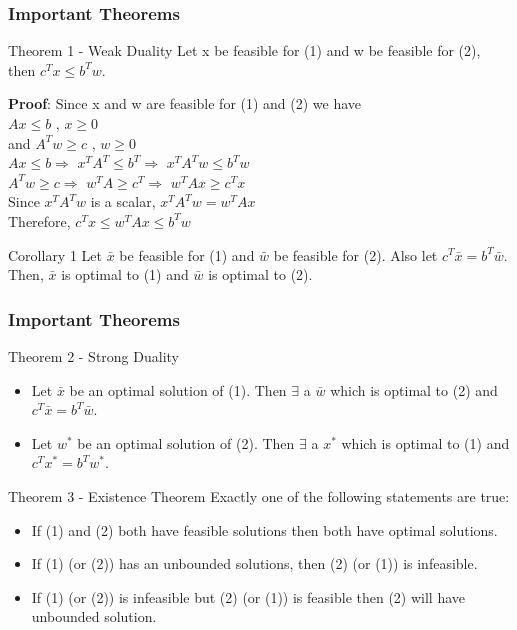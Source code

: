 \documentclass[9pt]{beamer}
\begin{document}
\begin{frame}
\frametitle{Important Theorems}
\begin{block}{Theorem 1 - Weak Duality}
Let x be feasible for (1) and w be feasible for (2), then $ c^T x \leq b^T w $.
\end{block}

\textbf{Proof}: Since x and w are feasible for (1) and (2) we have \\
$ A x \leq b $ , $ x \geq 0 $ \\
and $ A^T w \geq c $ , $ w \geq 0$ \\

$ A x \leq b \Rightarrow $ $ x^T A^T \leq b^T \Rightarrow$ $ x^T A^T w \leq b^T w$\\

$ A^T w \geq c \Rightarrow $ $ w^T A \geq c^T \Rightarrow$ $ w^T A x \geq c^T x$\\

Since $ x^T A^T w $ is a scalar, $ x^T A^T w = w^T A x $\\

Therefore, $ c^T x \leq w^T A x \leq b^T w $

\begin{block}{Corollary 1}
Let $ \bar{x} $ be feasible for (1) and $ \bar{w} $ be feasible for (2). Also let $ c^T \bar{x} = b^T \bar{w} $.\\
Then, $ \bar{x} $ is optimal to (1) and $ \bar{w} $ is optimal to (2). 
\end{block}
\end{frame}

\begin{frame}
\frametitle{Important Theorems}
\begin{block}{Theorem 2 - Strong Duality}
\begin{itemize}
    \item Let $ \bar{x} $ be an optimal solution of (1). Then $ \exists $ a $ \bar{w} $ which is optimal to (2) and $ c^T \bar{x} = b^T \bar{w} $. 
    \item Let $ w^* $ be an optimal solution of (2). Then $ \exists $ a $ x^* $ which is optimal to (1) and $ c^T x^* = b^T w^* $. 
\end{itemize}
\end{block}

\begin{block}{Theorem 3 - Existence Theorem}
Exactly one of the following statements are true: 
\begin{itemize}
    \item If (1) and (2) both have feasible solutions then both have optimal solutions.
    \item If (1) (or (2)) has an unbounded solutions, then (2) (or (1)) is infeasible.
    \item If (1) (or (2)) is infeasible but (2) (or (1)) is feasible then (2) will have unbounded solution. 
\end{itemize}
\end{block}
\end{frame}
\end{document}
